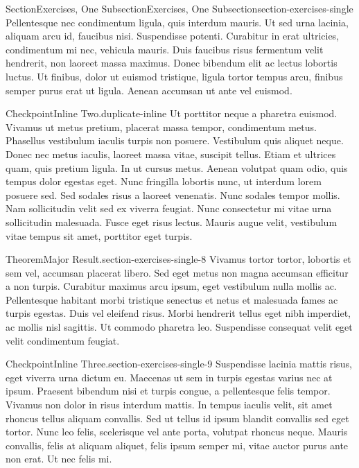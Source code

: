 \documentclass[twoside,10pt,]{article}
\numberwithin{equation}{section}
\begin{document}
\begin{sectionptx}{Section}{Exercises, One Subsection}{}{Exercises, One Subsection}{}{}{section-exercises-single}
Pellentesque nec condimentum ligula, quis interdum mauris. Ut sed urna lacinia, aliquam arcu id, faucibus nisi. Suspendisse potenti. Curabitur in erat ultricies, condimentum mi nec, vehicula mauris. Duis faucibus risus fermentum velit hendrerit, non laoreet massa maximus. Donec bibendum elit ac lectus lobortis luctus. Ut finibus, dolor ut euismod tristique, ligula tortor tempus arcu, finibus semper purus erat ut ligula. Aenean accumsan ut ante vel euismod.%
\begin{inlineexercise}{Checkpoint}{Inline Two.}{duplicate-inline}%
Ut porttitor neque a pharetra euismod. Vivamus ut metus pretium, placerat massa tempor, condimentum metus. Phasellus vestibulum iaculis turpis non posuere. Vestibulum quis aliquet neque. Donec nec metus iaculis, laoreet massa vitae, suscipit tellus. Etiam et ultrices quam, quis pretium ligula. In ut cursus metus. Aenean volutpat quam odio, quis tempus dolor egestas eget. Nunc fringilla lobortis nunc, ut interdum lorem posuere sed. Sed sodales risus a laoreet venenatis. Nunc sodales tempor mollis. Nam sollicitudin velit sed ex viverra feugiat. Nunc consectetur mi vitae urna sollicitudin malesuada. Fusce eget risus lectus. Mauris augue velit, vestibulum vitae tempus sit amet, porttitor eget turpis.%
\end{inlineexercise}%
\begin{theorem}{Theorem}{Major Result.}{}{section-exercises-single-8}%
Vivamus tortor tortor, lobortis et sem vel, accumsan placerat libero. Sed eget metus non magna accumsan efficitur a non turpis. Curabitur maximus arcu ipsum, eget vestibulum nulla mollis ac. Pellentesque habitant morbi tristique senectus et netus et malesuada fames ac turpis egestas. Duis vel eleifend risus. Morbi hendrerit tellus eget nibh imperdiet, ac mollis nisl sagittis. Ut commodo pharetra leo. Suspendisse consequat velit eget velit condimentum feugiat.%
\end{theorem}
\begin{inlineexercise}{Checkpoint}{Inline Three.}{section-exercises-single-9}%
Suspendisse lacinia mattis risus, eget viverra urna dictum eu. Maecenas ut sem in turpis egestas varius nec at ipsum. Praesent bibendum nisi et turpis congue, a pellentesque felis tempor. Vivamus non dolor in risus interdum mattis. In tempus iaculis velit, sit amet rhoncus tellus aliquam convallis. Sed ut tellus id ipsum blandit convallis sed eget tortor. Nunc leo felis, scelerisque vel ante porta, volutpat rhoncus neque. Mauris convallis, felis at aliquam aliquet, felis ipsum semper mi, vitae auctor purus ante non erat. Ut nec felis mi.%

\end{inlineexercise}
\end{sectionptx}
\end{document}

